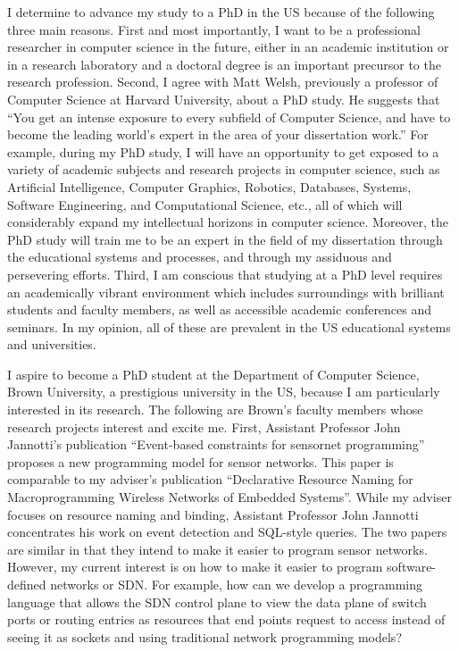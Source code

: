 \documentclass[a4paper,10pt]{report}
\newcommand{\university}{Brown University}
\newcommand{\department}{Department of Computer Science}
\newcommand{\uniabbre}{Brown}
\begin{document}
\vspace{0.2cm}
I determine to advance my study to a PhD in the US because of the following three main reasons. First and most importantly, I want to be a professional researcher in computer science in the future, either in an academic institution or in a research laboratory and a doctoral degree is an important precursor to the research profession. Second, I agree with Matt Welsh, previously a professor of Computer Science at Harvard University, about a PhD study. He suggests that ``You get an intense exposure to every subfield of Computer Science, and have to become the leading world's expert in the area of your dissertation work.'' For example, during my PhD study, I will have an opportunity to get exposed to a variety of academic subjects and research projects in computer science, such as Artificial Intelligence, Computer Graphics, Robotics, Databases, Systems, Software Engineering, and Computational Science, etc., all of which will considerably expand my intellectual horizons in computer science. Moreover, the PhD study will train me to be an expert in the field of my dissertation through the educational systems and processes, and through my assiduous and persevering efforts. Third, I am conscious that studying at a PhD level requires an academically vibrant environment which includes surroundings with brilliant students and faculty members, as well as accessible academic conferences and seminars. In my opinion, all of these are prevalent in the US educational systems and universities.

\vspace{0.2cm}
I aspire to become a PhD student at the \department, \university, a prestigious university in the US, because I am particularly interested in its research. The following are \uniabbre's faculty members whose research projects interest and excite me. First, Assistant Professor John Jannotti's publication ``Event-based constraints for sensornet programming'' proposes a new programming model for sensor networks. This paper is comparable to my adviser's publication ``Declarative Resource Naming for Macroprogramming Wireless Networks of Embedded Systems''. While my adviser focuses on resource naming and binding, Assistant Professor John Jannotti concentrates his work on event detection and SQL-style queries. The two papers are similar in that they intend to make it easier to program sensor networks. However, my current interest is on how to make it easier to program software-defined networks or SDN. For example, how can we develop a programming language that allows the SDN control plane to view the data plane of switch ports or routing entries as resources that end points request to access instead of seeing it as sockets and using traditional network programming models?
\end{document}
